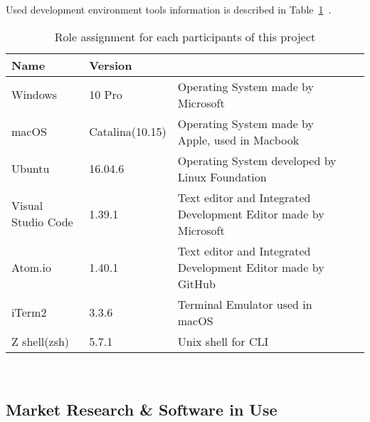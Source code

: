\documentclass[conference,compsoc]{IEEEtran}
\begin{document}
Used development environment tools information is described in Table~\ref{tab:table3}\ .

\begin{table}[h] {\renewcommand\arraystretch{1.25}
\begin{tabular}{|l|l|l|l|} \hline
\bf Name & \bf Version & \bf \multicolumn{1}{l}{Description} \\ \hline

Windows & 10 Pro & \multicolumn{1}{p{3.3cm}|}{\raggedright Operating System made by Microsoft} \\ \hline
macOS & Catalina(10.15) & \multicolumn{1}{p{3.3cm}|}{\raggedright Operating System made by Apple, used in Macbook} \\ \hline
Ubuntu & 16.04.6 & \multicolumn{1}{p{3.3cm}|}{\raggedright Operating System developed by Linux Foundation} \\ \hline
Visual Studio Code & 1.39.1 & \multicolumn{1}{p{3.3cm}|}{\raggedright Text editor and Integrated Development Editor made by Microsoft} \\ \hline
Atom.io & 1.40.1 & \multicolumn{1}{p{3.3cm}|}{\raggedright Text editor and Integrated Development Editor made by GitHub} \\ \hline
iTerm2 & 3.3.6 & \multicolumn{1}{p{3.3cm}|}{\raggedright Terminal Emulator used in macOS} \\ \hline
Z shell(zsh) & 5.7.1 & \multicolumn{1}{p{3.3cm}|}{\raggedright Unix shell for CLI} \\ \hline

\end{tabular}} \\
\caption{Role assignment for each participants of this project}
\label{tab:table3}
\end{table}

\subsection{Market Research \& Software in Use}
\end{document}
